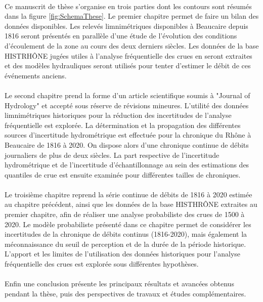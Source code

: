 	\paragraph{} Ce manuscrit de thèse s'organise en trois parties dont les contours sont résumés dans la figure \ref{fig:SchemaThese}. Le premier chapitre permet de faire un bilan des données disponibles. Les relevés limnimétriques disponibles à Beaucaire depuis 1816  seront présentés en parallèle d'une étude de l'évolution des conditions d'écoulement de la zone au cours des deux derniers siècles. Les données de la base HISTRHÔNE jugées utiles à l'analyse fréquentielle des crues en seront extraites et des modèles hydrauliques seront utilisés pour tenter d'estimer le débit de ces événements anciens. 
	
	\paragraph{} Le second chapitre prend la forme d'un article scientifique soumis à "Journal of Hydrology" et accepté sous réserve de révisions mineures. L'utilité des données limnimétriques historiques pour la réduction des incertitudes de l'analyse fréquentielle est explorée. La détermination et la propagation des différentes sources d'incertitude hydrométrique est effectuée pour la chronique du Rhône à Beaucaire de 1816 à 2020. On dispose alors d'une chronique continue de débits journaliers de plus de deux siècles. La part respective de l'incertitude hydrométrique et de l'incertitude d'échantillonnage au sein des estimations des quantiles de crue est ensuite examinée pour différentes tailles de chroniques. 
	
	\paragraph{} Le troisième chapitre reprend la série continue de débits de 1816 à 2020 estimée au chapitre précédent, ainsi que les données de la base HISTHRÔNE extraites au premier chapitre, afin de réaliser une analyse probabiliste des crues de 1500 à 2020. Le modèle probabiliste présenté dans ce chapitre permet de considérer les incertitudes de la chronique de débits continus (1816-2020), mais également la méconnaissance du seuil de perception et de la durée de la période historique. L'apport et les limites de l'utilisation des données historiques pour l'analyse fréquentielle des crues est explorée sous différentes hypothèses. 
	
	\paragraph{} Enfin une conclusion présente les principaux résultats et avancées obtenus pendant la thèse, puis des perspectives de travaux et études complémentaires.
	

